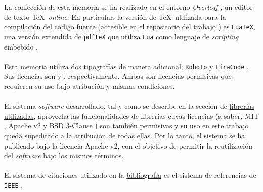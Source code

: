  \label{sec:consideraciones}

    La confección de esta memoria se ha realizado en el entorno \textit{Overleaf} \cite{OVERLEAF}, un editor de texto \TeX\  \textit{online}. En particular, la versión de \TeX\  utilizada para la compilación del código fuente (accesible en el repositorio del trabajo \cite{TFGTEX}) es \texttt{LuaTeX}, una versión extendida de \texttt{pdfTeX} que utiliza \texttt{Lua} como lenguaje de \textit{scripting} embebido \cite{LUATEX}.
    \\ \\
    Esta memoria utiliza dos tipografías de manera adicional; \texttt{Roboto} \cite{ROBOTO} y \texttt{FiraCode} \cite{FIRACODE}. Sus licencias son \cite{LICAPACHE} y \cite{LICSIL}, respectivamente. Ambas son licencias permisivas que requieren su uso bajo atribución y mismas condiciones.
    \\ \\
    El sistema \textit{software} desarrollado, tal y como se describe en la sección de \hyperref[subsubsec:librerias]{librerías utilizadas}, aprovecha las funcionalidades de librerías cuyas licencias (a saber, MIT \cite{LICMIT}, Apache v2\cite{LICAPACHE} y BSD 3-Clause \cite{LICBSD3}) son también permisivas y su uso en este trabajo queda supeditado a la atribución de todas ellas. Por lo tanto, el sistema se ha publicado bajo la licencia Apache v2, con el objetivo de permitir la reutilización del \textit{software} bajo los mismos términos.
    \\ \\
    El sistema de citaciones utilizado en la \hyperref[sec:referencias]{bibliografía} es el sistema de referencias de \texttt{IEEE} \cite{IEEEREF}.

\newpage